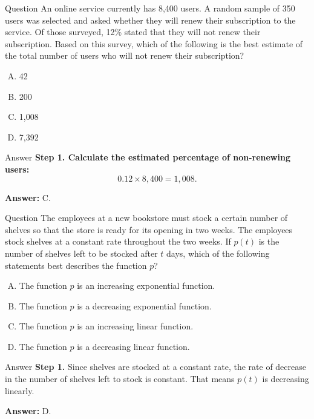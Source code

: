 \documentclass{beamer}
\begin{document}
\begin{frame}{Question}
An online service currently has 8,400 users. A random sample of 350 users was selected and asked whether they will renew their subscription to the service. Of those surveyed, 12\% stated that they will not renew their subscription. Based on this survey, which of the following is the best estimate of the total number of users who will not renew their subscription?

\begin{enumerate}[A.]
    \item 42
    \item 200
    \item 1,008
    \item 7,392
\end{enumerate}
\end{frame}


\begin{frame}{Answer}
\textbf{Step 1. Calculate the estimated percentage of non-renewing users:}
\[
0.12 \times 8,400 = 1,008.
\]

\textbf{Answer:} C.
\end{frame}


\begin{frame}{Question}
The employees at a new bookstore must stock a certain number of shelves so that the store is ready for its opening in two weeks. The employees stock shelves at a constant rate throughout the two weeks. If $p(t)$ is the number of shelves left to be stocked after $t$ days, which of the following statements best describes the function $p$?

\begin{enumerate}[A.]
    \item The function $p$ is an increasing exponential function.
    \item The function $p$ is a decreasing exponential function.
    \item The function $p$ is an increasing linear function.
    \item The function $p$ is a decreasing linear function.
\end{enumerate}
\end{frame}


\begin{frame}{Answer}
\textbf{Step 1.} Since shelves are stocked at a constant rate, the rate of decrease in the number of shelves left to stock is constant. That means $p(t)$ is decreasing linearly.

\textbf{Answer:} D.
\end{frame}
\end{document}
